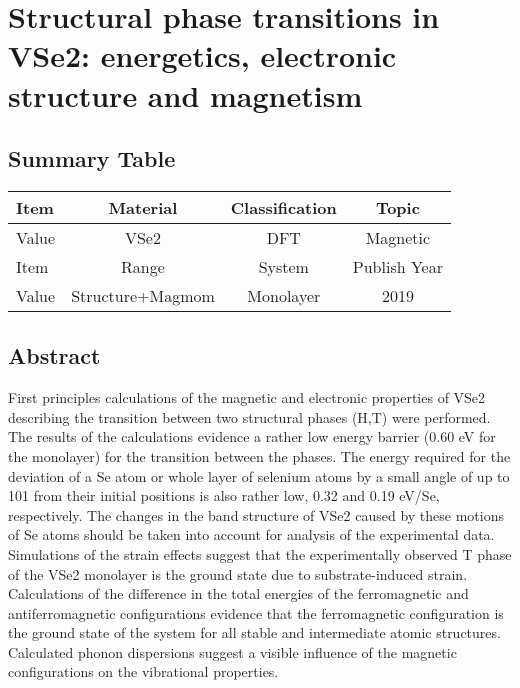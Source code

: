 \setchapterpreamble[u]{\margintoc}
\chapter{Structural phase transitions in VSe2: energetics, electronic structure and magnetism\cite{C9CP03726H}}

\section{Summary Table}

\begin{table}[h]
    \begin{tabular}{lccc}
    \hline
    Item  & Material         & Classification & Topic        \\  \hline
    Value & VSe2             & DFT            & Magnetic     \\  \hline
    Item  & Range            & System         & Publish Year \\  \hline
    Value & Structure+Magmom & Monolayer      & 2019         \\  \hline
    \end{tabular}
\end{table}

\section{Abstract}
First principles calculations of the magnetic and electronic properties of VSe2 describing the transition between two structural phases (H,T) were performed. The results of the calculations evidence a rather low energy barrier (0.60 eV for the monolayer) for the transition between the phases. The energy required for the deviation of a Se atom or whole layer of selenium atoms by a small angle of up to 101 from their initial positions is also rather low, 0.32 and 0.19 eV/Se, respectively. The changes in the band structure of VSe2 caused by these motions of Se atoms should be taken into account for analysis of the experimental data. Simulations of the strain effects suggest that the experimentally observed T phase of the VSe2 monolayer is the ground state due to substrate-induced strain. Calculations of the difference in the total energies of the ferromagnetic and antiferromagnetic configurations evidence that the ferromagnetic configuration is the ground state of the system for all stable and intermediate atomic structures. Calculated phonon dispersions suggest a visible influence of the magnetic configurations on the vibrational properties.

